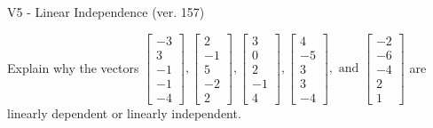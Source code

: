 \begin{exercise}
  \begin{exerciseTitle}V5 - Linear Independence (ver. 157)\end{exerciseTitle}
  \begin{exerciseStatement}
    Explain why the vectors \(\left[\begin{array}{r}
-3 \\
3 \\
-1 \\
-1 \\
-4
\end{array}\right] , \left[\begin{array}{r}
2 \\
-1 \\
5 \\
-2 \\
2
\end{array}\right] , \left[\begin{array}{r}
3 \\
0 \\
2 \\
-1 \\
4
\end{array}\right] , \left[\begin{array}{r}
4 \\
-5 \\
3 \\
3 \\
-4
\end{array}\right] , \text{ and } \left[\begin{array}{r}
-2 \\
-6 \\
-4 \\
2 \\
1
\end{array}\right]\) are linearly dependent or linearly independent.	



\end{exerciseStatement}
\end{exercise}
